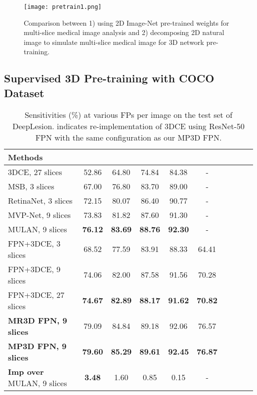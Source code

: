 \documentclass[runningheads]{llncs}
\begin{document}
\begin{figure}[!tbp]
\texttt{[image: pretrain1.png]}
\caption{Comparison between 1) using 2D Image-Net pre-trained weights for multi-slice medical image analysis and 2) decomposing 2D natural image to simulate multi-slice medical image for 3D network pre-training. } \label{pretrain}
\end{figure}

\subsection{Supervised 3D Pre-training with COCO Dataset}


\begin{table}[!htbp]
    \caption{Sensitivities (\%) at various FPs per image on the test set of DeepLesion.  indicates re-implementation of 3DCE using ResNet-50 FPN with the same configuration as our MP3D FPN.}
    \label{tab1}
    \centering
    \footnotesize \setlength{\tabcolsep}{8pt}\renewcommand{\arraystretch}{1.2}\centering
        \label{tab:sample_1}
        \begin{tabular}{l|ccccccccc}
            \hline
            \textbf{Methods} &  &  &  &  &  \\
\hline
            \hline
            3DCE, 27 slices\cite{3DCE} & 52.86 & 64.80 & 74.84 & 84.38 &-\\
            MSB, 3 slices\cite{MSB} & 67.00 & 76.80 & 83.70 & 89.00 &-\\
            RetinaNet, 3 slices\cite{Retina} & 72.15 & 80.07 & 86.40 & 90.77 &-\\
	    MVP-Net, 9 slices\cite{MVP} & 73.83 & 81.82 & 87.60 & 91.30 &-\\		
	    MULAN, 9 slices\cite{MULAN} & \textbf{76.12} & \textbf{83.69} & \textbf{88.76} & \textbf{92.30} &-\\
            \hline
            FPN+3DCE, 3 slices &68.52 & 77.59 & 83.91  & 88.33 & 64.41\\
            FPN+3DCE, 9 slices  &74.06 & 82.00 & 87.58 & 91.56 & 70.28\\
            FPN+3DCE, 27 slices  &\textbf{74.67} & \textbf{82.89} & \textbf{88.17} & \textbf{91.62} & \textbf{70.82}\\
            \hline
            \textbf{MR3D FPN, 9 slices} & 79.09 & 84.84 & 89.18 & 92.06  & 76.57\\
            \textbf{MP3D FPN, 9 slices} & \textbf{79.60} & \textbf{85.29} & \textbf{89.61}  & \textbf{92.45}  & \textbf{76.87} \\
            \hline
            \textbf{Imp over} MULAN, 9 slices & \textbf{3.48}  & 1.60 & 0.85 & 0.15&- \\
 
        \end{tabular}
\end{table}
\end{document}
